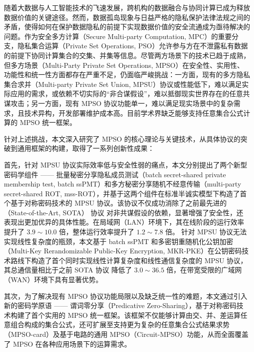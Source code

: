 
\begin{cnabstract}

    随着大数据与人工智能技术的飞速发展，跨机构的数据融合与协同计算已成为释放数据价值的关键途径。然而，数据孤岛现象与日益严格的隐私保护法律法规之间的矛盾，使得如何在保护数据隐私的前提下实现数据价值的安全流通成为亟待解决的问题。作为安全多方计算（Secure Multi-party Computation, MPC）的重要分支，隐私集合运算（Private Set Operations, PSO）允许参与方在不泄露私有数据的前提下协同计算集合的交集、并集等信息。尽管两方场景下的技术已趋于成熟，但多方场景（Multi-Party Private Set Operations, MPSO）在安全性、实用性、功能性和统一性方面都存在严重不足，仍面临严峻挑战：一方面，现有的多方隐私集合求并（Multi-party Private Set Union, MPSU）协议或性能低下，难以满足实际应用的需求，或依赖不切实际的“非合谋假设”，难以抵御现实世界存在的任意共谋攻击；另一方面，现有 MPSO 协议功能单一，难以满足现实场景中的复杂需求，且技术异构，开发部署维护成本高。目前学术界缺乏能够支持任意集合公式计算的 MPSO 统一框架。

    针对上述挑战，本文深入研究了 MPSO 的核心理论与关键技术，从具体协议的突破到通用框架的构建，取得了一系列创新性成果：

    首先，针对 MPSU 协议实际效率低与安全性弱的痛点，本文分别提出了两个新型密码学组件 —— 批量秘密分享隐私成员测试（batch secret-shared private membership test, batch ssPMT）和多方秘密分享随机不经意传输（multi-party secret-shared ROT, mss-ROT），并基于这两个组件在标准半诚实模型下构造了首个基于对称密码技术的 MPSU 协议。该协议不仅成功消除了之前最先进的（State-of-the-Art, SOTA） 协议 \cite{LG-ASIACRYPT-2023} 对非共谋假设的依赖，显著增强了安全性，还表现出更加优异的具体性能。在局域网（LAN）环境下，其在线阶段的运行效率提升了 $3.9 \sim 10.0$ 倍，整体运行效率提升了 $1.2 \sim 7.8$ 倍。
    针对 MPSU 协议无法实现线性复杂度的瓶颈，本文基于 batch ssPMT 和多密钥重随机化公钥加密（Multi-Key Rerandomizable Public-Key Encryption, MKR-PKE）在公钥密码技术路线下构造了首个同时实现线性计算复杂度和线性通信复杂度的 MPSU 协议，其总通信量相比于之前 SOTA 协议 \cite{LG-ASIACRYPT-2023} 降低了 $3.0 \sim 36.5$ 倍，在带宽受限的广域网（WAN）环境下具有显著优势。

    其次，为了解决现有 MPSO 协议功能局限以及缺乏统一性的难题，本文通过引入新的密码学原语 —— 谓词零分享（Predicative Zero-Sharing），基于对称密码技术构建了首个实用的 MPSO 统一框架。该框架不仅能够计算由交、并、差运算任意组合构成的集合公式，还可扩展至支持更为复杂的任意集合公式结果求势（MPSO-card）及基于电路的通用 MPSO（Circuit-MPSO）功能，从而全面覆盖了 MPSO 在各种应用场景下的运算需求。


\end{cnabstract}
